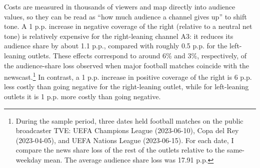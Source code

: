 \documentclass[12pt]{article}
\begin{document}





Costs are measured in thousands of viewers and map directly into audience values, so they can be read as “how much audience a channel gives up” to shift tone. A 1 p.p. increase in negative coverage of the right (relative to a neutral net tone) is relatively expensive for the right-leaning channel A3: it reduces its audience share by about 1.1 p.p., compared with roughly 0.5 p.p. for the left-leaning outlets. These effects correspond to around 6\% and  3\%, respectively, of the audience-share loss observed when major football matches coincide with the newscast.\footnote{ During the sample period, three dates held football matches on the public broadcaster TVE:  UEFA Champions League (2023-06-10), Copa del Rey (2023-04-05), and UEFA Nations League (2023-06-15). For each date, I compare the news share loss of the rest of the outlets relative to the same-weekday mean. The average audience share loss was 17.91 p.p.} In contrast, a 1 p.p. increase in positive coverage of the right is 6 p.p. less costly than going negative for the right-leaning outlet, while for left-leaning outlets it is 1 p.p. more costly than going negative. 
\end{document}
